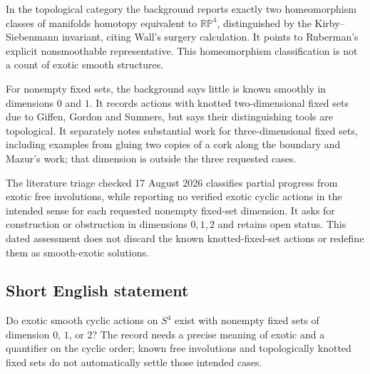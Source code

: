 \documentclass[11pt]{article}
\begin{document}
In the topological category the background reports exactly two homeomorphism classes of manifolds homotopy equivalent to $\mathbb{RP}^4$, distinguished by the Kirby--Siebenmann invariant, citing Wall's surgery calculation. It points to Ruberman's explicit nonsmoothable representative. This homeomorphism classification is not a count of exotic smooth structures.

For nonempty fixed sets, the background says little is known smoothly in dimensions $0$ and $1$. It records actions with knotted two-dimensional fixed sets due to Giffen, Gordon and Sumners, but says their distinguishing tools are topological. It separately notes substantial work for three-dimensional fixed sets, including examples from gluing two copies of a cork along the boundary and Mazur's work; that dimension is outside the three requested cases.

The literature triage checked 17 August 2026 classifies partial progress from exotic free involutions, while reporting no verified exotic cyclic actions in the intended sense for each requested nonempty fixed-set dimension. It asks for construction or obstruction in dimensions $0,1,2$ and retains open status. This dated assessment does not discard the known knotted-fixed-set actions or redefine them as smooth-exotic solutions.
\subsection{Short English statement}
Do exotic smooth cyclic actions on $S^4$ exist with nonempty fixed sets of dimension $0$, $1$, or $2$? The record needs a precise meaning of exotic and a quantifier on the cyclic order; known free involutions and topologically knotted fixed sets do not automatically settle those intended cases.
\end{document}
